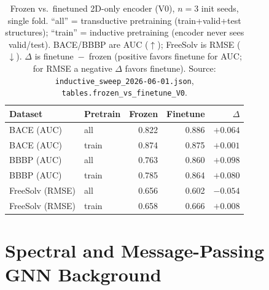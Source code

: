 \documentclass[sigconf,nonacm,anonymous,review]{acmart}
\begin{document}
\begin{table}[t]
\centering
\caption{Frozen vs.\ finetuned 2D-only encoder (V0), $n{=}3$ init seeds,
single fold. ``all'' = transductive pretraining (train+valid+test
structures); ``train'' = inductive pretraining (encoder never sees
valid/test). BACE/BBBP are AUC ($\uparrow$); FreeSolv is RMSE
($\downarrow$). $\Delta$ is finetune~$-$~frozen (positive favors finetune
for AUC; for RMSE a negative $\Delta$ favors finetune).
Source: \texttt{inductive\_sweep\_2026-06-01.json},
\texttt{tables.frozen\_vs\_finetune\_V0}.}
\label{tab:frozen-vs-finetune}
\small
\begin{tabular}{llrrr}
\toprule
Dataset & Pretrain & Frozen & Finetune & $\Delta$ \\
\midrule
BACE (AUC)     & all   & 0.822 & 0.886 & $+0.064$ \\
BACE (AUC)     & train & 0.874 & 0.875 & $+0.001$ \\
BBBP (AUC)     & all   & 0.763 & 0.860 & $+0.098$ \\
BBBP (AUC)     & train & 0.785 & 0.864 & $+0.080$ \\
FreeSolv (RMSE)& all   & 0.656 & 0.602 & $-0.054$ \\
FreeSolv (RMSE)& train & 0.658 & 0.666 & $+0.008$ \\
\bottomrule
\end{tabular}
\end{table}

\section{Spectral and Message-Passing GNN Background}
\end{document}
